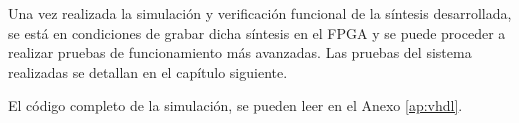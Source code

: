 Una vez realizada la simulación y verificación funcional de la síntesis desarrollada, se está en condiciones de grabar dicha síntesis en el FPGA y se puede proceder a realizar pruebas de funcionamiento más avanzadas. Las pruebas del sistema realizadas se detallan en el capítulo siguiente.

El código completo de la simulación, se pueden leer en el Anexo \ref{ap:vhdl}.